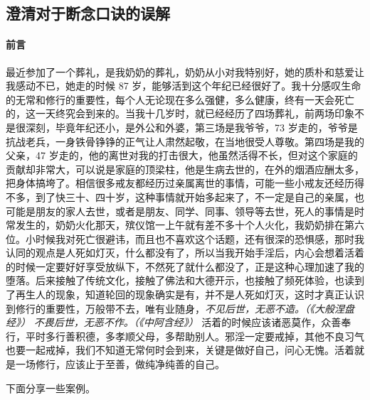 \subsection{澄清对于断念口诀的误解}\label{124}

\paragraph*{前言}

最近参加了一个葬礼，是我奶奶的葬礼，奶奶从小对我特别好，她的质朴和慈爱让我感动不已，她走的时候 87 岁，能够活到这个年纪已经很好了。我十分感叹生命的无常和修行的重要性，每个人无论现在多么强健，多么健康，终有一天会死亡的，这一天终究会到来的。当我十几岁时，就已经经历了四场葬礼，前两场印象不是很深刻，毕竟年纪还小，是外公和外婆，第三场是我爷爷，73 岁走的，爷爷是抗战老兵，一身铁骨铮铮的正气让人肃然起敬，在当地很受人尊敬。第四场是我的父亲，47 岁走的，他的离世对我的打击很大，他虽然活得不长，但对这个家庭的贡献却非常大，可以说是家庭的顶梁柱，他是生病去世的，在外的烟酒应酬太多，把身体搞垮了。相信很多戒友都经历过亲属离世的事情，可能一些小戒友还经历得不多，到了快三十、四十岁，这种事情就开始多起来了，不一定是自己的亲属，也可能是朋友的家人去世，或者是朋友、同学、同事、领导等去世，死人的事情是时常发生的，奶奶火化那天，殡仪馆一上午就有差不多十个人火化，我奶奶排在第六位。小时候我对死亡很避讳，而且也不喜欢这个话题，还有很深的恐惧感，那时我认同的观点是人死如灯灭，什么都没有了，所以当我开始手淫后，内心会想着活着的时候一定要好好享受放纵下，不然死了就什么都没了，正是这种心理加速了我的堕落。后来接触了传统文化，接触了佛法和大德开示，也接触了频死体验，也读到了再生人的现象，知道轮回的现象确实是有，并不是人死如灯灭，这时才真正认识到修行的重要性，万般带不去，唯有业随身，\textit{不见后世，无恶不造。（《大般涅盘经》）} \textit{不畏后世，无恶不作。（《中阿含经》）} 活着的时候应该诸恶莫作，众善奉行，平时多行善积德，多孝顺父母，多帮助别人。邪淫一定要戒掉，其他不良习气也要一起戒掉，我们不知道无常何时会到来，关键是做好自己，问心无愧。活着就是一场修行，应该止于至善，做纯净纯善的自己。

下面分享一些案例。

